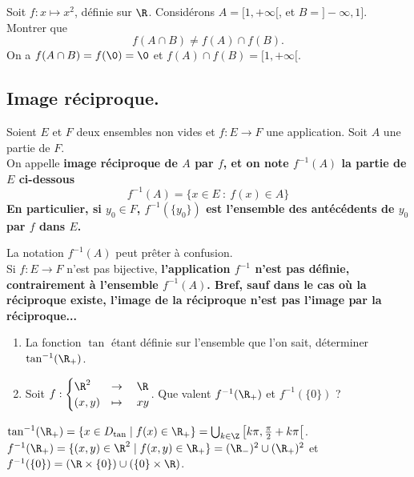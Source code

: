 \documentclass[11pt]{article}
\begin{document}
\begin{ex}{}{}
    Soit $f:x\mapsto x^2$, définie sur $\R$. Considérons $A=[1,+\infty[$, et $B=]-\infty,1]$. Montrer que
    \begin{equation*}
        f(A\cap B) \neq f(A) \cap f(B).
    \end{equation*}
    \tcblower
    On a $f(A\cap B) = f(\0) = \0$ et $f(A)\cap f(B)=[1,+\infty[$.
\end{ex}

\subsection{Image réciproque.}

\begin{defi}{}{}
    Soient $E$ et $F$ deux ensembles non vides et $f:E\to F$ une application. Soit $A$ une partie de $F$.\\
    On appelle \bf{image réciproque} de $A$ par $f$, et on note $f^{-1}(A)$ la partie de $E$ ci-dessous
    \begin{equation*}
        f^{-1}(A)=\{x\in E ~:~ f(x)\in A\}
    \end{equation*}
    En particulier, si $y_0\in F$, $f^{-1}(\{y_0\})$ est l'ensemble des antécédents de $y_0$ par $f$ dans $E$.
\end{defi}

\warning La notation $f^{-1}(A)$ peut prêter à confusion.\\
Si $f:E\to F$ n'est pas bijective, \bf{l'application $f^{-1}$ n'est pas définie}, contrairement à l'ensemble $f^{-1}(A)$. Bref, sauf dans le cas où la réciproque existe, l'image de la réciproque n'est pas l'image par la réciproque...

\begin{ex}{}{}
    \begin{enumerate}
        \item La fonction $\tan$ étant définie sur l'ensemble que l'on sait, déterminer $\tan^{-1}(\R_+)$.
        \item Soit $f:\begin{cases}\R^2&\to\quad\R\\(x,y)&\mapsto\quad xy\end{cases}$. Que valent $f^{-1}(\R_+)$ et $f^{-1}(\{0\})$ ?
    \end{enumerate}
    \tcblower
     $\tan^{-1}(\R_+)=\{x\in D_{\tan} \mid f(x) \in \R_+\}=\bigcup_{k\in\Z}\left[ k\pi, \frac{\pi}{2}+k\pi \right[$.\\
     $f^{-1}(\R_+)=\{(x,y)\in\R^2\mid f(x,y)\in\R_+\}=(\R_-)^2\cup(\R_+)^2$ et $f^{-1}(\{0\})=(\R\times\{0\})\cup(\{0\}\times\R)$.
\end{ex}
\end{document}
